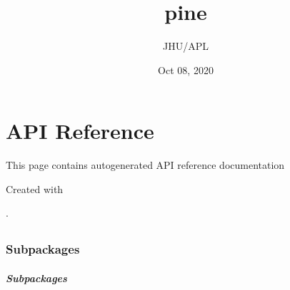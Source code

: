 \documentclass[letterpaper,10pt,english]{sphinxmanual}
\title{pine}
\date{Oct 08, 2020}
\author{JHU/APL}
\begin{document}
\pagestyle{empty}
\sphinxmaketitle
\pagestyle{plain}
\sphinxtableofcontents
\pagestyle{normal}
\label{\detokenize{index::doc}}



\chapter{API Reference}
\label{\detokenize{autoapi/index:api-reference}}\label{\detokenize{autoapi/index::doc}}
This page contains auto\sphinxhyphen{}generated API reference documentation %
\begin{footnote}[1]\sphinxAtStartFootnote
Created with 
%
\end{footnote}.


\section{}
\label{\detokenize{autoapi/pine/index:module-pine}}\label{\detokenize{autoapi/pine/index:pine}}\label{\detokenize{autoapi/pine/index::doc}}

\subsection{Subpackages}
\label{\detokenize{autoapi/pine/index:subpackages}}

\subsubsection{}
\label{\detokenize{autoapi/pine/backend/index:module-pine.backend}}\label{\detokenize{autoapi/pine/backend/index:pine-backend}}\label{\detokenize{autoapi/pine/backend/index::doc}}

\paragraph{Subpackages}
\label{\detokenize{autoapi/pine/backend/index:subpackages}}

\subparagraph{}
\label{\detokenize{autoapi/pine/backend/admin/index:module-pine.backend.admin}}\label{\detokenize{autoapi/pine/backend/admin/index:pine-backend-admin}}\label{\detokenize{autoapi/pine/backend/admin/index::doc}}
\end{document}
